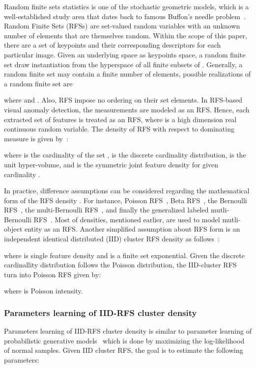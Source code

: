 \documentclass[journal]{IEEEtran}
\begin{document}
Random finite sets statistics is one of the stochastic geometric models, which is a well-established study area that dates back to famous Buffon's needle problem~\cite{chiu2013stochastic}. Random Finite Sets (RFSs) are set-valued random variables with an unknown number of elements that are themselves random. Within the scope of this paper, there are a set of keypoints and their corresponding descriptors for each particular image. Given an underlying space  as keypoints space, a random finite set draw instantiation from the hyperspace of all finite subsets  of . Generally, a random finite set may contain a finite number of elements, possible realizations of a random finite set  are


where  and . Also, RFS impose no ordering on their set elements. In RFS-based visual anomaly detection, the measurements are modeled as an RFS. Hence, each extracted set of features  is treated as an RFS, where  is a high dimension real continuous random variable. The density of RFS with respect to dominating measure  is given by~\cite{vo2018model}:


where  is the cardinality of the set ,  is the discrete cardinality distribution,  is the unit hyper-volume, and  is the symmetric joint feature density for given cardinality .

In practice, difference assumptions can be considered regarding the mathematical form of the RFS density . For instance, Poisson RFS~\cite{1261119Mahler}, Beta RFS~\cite{Kamoona9074564}, the Bernoulli RFS~\cite{mahler2007statistical}, the multi-Bernoulli RFS~\cite{vo2008cardinality}, and finally the generalized labeled mutli-Bernoulli RFS~\cite{papi2015generalized}. Most of densities, mentioned earlier, are used to model mutli-object entity as an RFS. Another simplified assumption about RFS form is an independent identical distributed (IID) cluster RFS density as follows~\cite{Vo2018,kamoona2019random}:



where  is single feature density and  is a finite set exponential. Given the discrete cardinallity distribution  follows the Poisson distribution, the IID-cluster RFS turn into Poisson RFS given by:

where  is Poisson intensity.
\subsubsection{Parameters learning of IID-RFS cluster density}
\label{sec:IDD_RFS_learning}
Parameters learning of IID-RFS cluster density is similar to parameter learning of probabilistic generative models~\cite{goodfellow2016deep} which is done by maximizing the log-likelihood of normal samples. Given IID cluster RFS, the goal is to estimate the following parameters:
\end{document}
